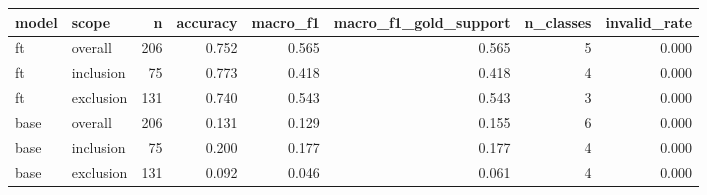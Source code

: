 \begin{tabular}{llrrrrrr}
\toprule
model & scope & n & accuracy & macro\_f1 & macro\_f1\_gold\_support & n\_classes & invalid\_rate \\
\midrule
ft & overall & 206 & 0.752 & 0.565 & 0.565 & 5 & 0.000 \\
ft & inclusion & 75 & 0.773 & 0.418 & 0.418 & 4 & 0.000 \\
ft & exclusion & 131 & 0.740 & 0.543 & 0.543 & 3 & 0.000 \\
base & overall & 206 & 0.131 & 0.129 & 0.155 & 6 & 0.000 \\
base & inclusion & 75 & 0.200 & 0.177 & 0.177 & 4 & 0.000 \\
base & exclusion & 131 & 0.092 & 0.046 & 0.061 & 4 & 0.000 \\
\bottomrule
\end{tabular}
